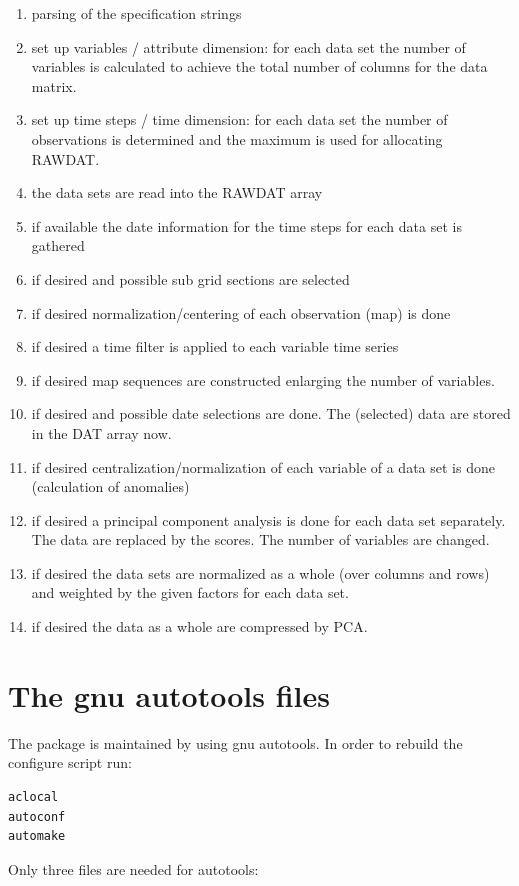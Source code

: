 \documentclass[12pt, oneside, a4paper, headsepline, plainheadsepline]{scrbook}
\begin{document}
\begin{enumerate}
\item parsing of the specification strings
\item set up variables / attribute dimension: for each data set the number of variables is calculated to achieve the total number of columns for the data matrix.
\item set up time steps / time dimension: for each data set the number of observations is determined and the maximum is used for allocating RAWDAT.
\item the data sets are read into the RAWDAT array
\item if available the date information for the time steps for each data set is gathered
\item if desired and possible sub grid sections are selected
\item if desired normalization/centering of each observation (map) is done
\item if desired a time filter is applied to each variable time series
\item if desired map sequences are constructed enlarging the number of variables.
\item if desired and possible date selections are done.  The (selected) data are stored in the DAT array now.
\item if desired centralization/normalization of each variable of a data set is done (calculation of anomalies)
\item if desired a principal component analysis is done for each data set separately. The data are replaced by the scores. The number of variables are changed.
\item if desired the data sets are normalized as a whole (over columns and rows) and weighted by the given factors for each data set.
\item if desired the data as a whole are compressed by PCA.
\end{enumerate}

\section{The gnu autotools files}


The package is maintained by using gnu autotools. In order to rebuild the configure script run:
\begin{lstlisting}
aclocal
autoconf
automake
\end{lstlisting}

Only three files are needed for autotools:
\end{document}
